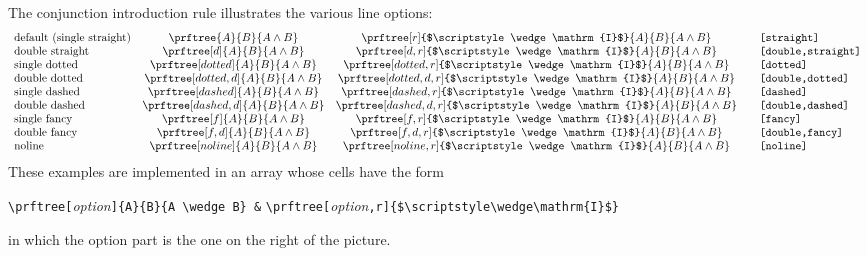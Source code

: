 \documentclass{amsart}
\begin{document}
The conjunction introduction rule illustrates the various line
options:
\begin{displaymath}
  \begin{array}{lcc@{\qquad}l}
    \mbox{default (single straight)} &
    \prftree{A}{B}{A \wedge B} &
    \prftree[r]{$\scriptstyle\wedge\mathrm{I}$}
    {A}{B}{A \wedge B} &
    \texttt{[straight]} \\
    \mbox{double straight} &
    \prftree[d]{A}{B}{A \wedge B} &
    \prftree[d,r]{$\scriptstyle\wedge\mathrm{I}$}
    {A}{B}{A \wedge B} &
    \texttt{[double,straight]} \\
    \mbox{single dotted} &
    \prftree[dotted]{A}{B}{A \wedge B} &
    \prftree[dotted,r]{$\scriptstyle\wedge\mathrm{I}$}
    {A}{B}{A \wedge B} &
    \texttt{[dotted]} \\
    \mbox{double dotted} &
    \prftree[dotted,d]{A}{B}{A \wedge B} &
    \prftree[dotted,d,r]{$\scriptstyle\wedge\mathrm{I}$}
    {A}{B}{A \wedge B} &
    \texttt{[double,dotted]} \\
    \mbox{single dashed} &
    \prftree[dashed]{A}{B}{A \wedge B} &
    \prftree[dashed,r]{$\scriptstyle\wedge\mathrm{I}$}
    {A}{B}{A \wedge B} &
    \texttt{[dashed]} \\
    \mbox{double dashed} &
    \prftree[dashed,d]{A}{B}{A \wedge B} &
    \prftree[dashed,d,r]{$\scriptstyle\wedge\mathrm{I}$}
    {A}{B}{A \wedge B} &
    \texttt{[double,dashed]} \\
    \mbox{single fancy} &
    \prftree[f]{A}{B}{A \wedge B} &
    \prftree[f,r]{$\scriptstyle\wedge\mathrm{I}$}
    {A}{B}{A \wedge B} &
    \texttt{[fancy]} \\
    \mbox{double fancy} &
    \prftree[f,d]{A}{B}{A \wedge B} &
    \prftree[f,d,r]{$\scriptstyle\wedge\mathrm{I}$}
    {A}{B}{A \wedge B} &
    \texttt{[double,fancy]} \\
    \mbox{noline} &
    \prftree[noline]{A}{B}{A \wedge B} &
    \prftree[noline,r]{$\scriptstyle\wedge\mathrm{I}$}
    {A}{B}{A \wedge B} &
    \texttt{[noline]}
  \end{array}
\end{displaymath}
These examples are implemented in an array whose cells have the form
\begin{center}
  \verb|\prftree[|\emph{option}\verb|]{A}{B}{A \wedge B} &|
  \verb|\prftree[|\emph{option}\verb|,r]{$\scriptstyle\wedge\mathrm{I}$}|
\end{center}
in which the option part is the one on the right of the
picture.\vspace{1ex} 
\end{document}
